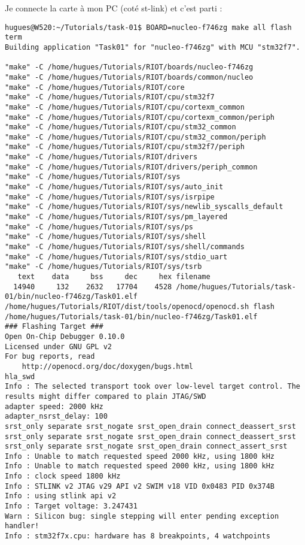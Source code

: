 Je connecte la carte à mon PC (coté st-link) et c'est parti :
{\scriptsize
\begin{verbatim}
hugues@W520:~/Tutorials/task-01$ BOARD=nucleo-f746zg make all flash term
Building application "Task01" for "nucleo-f746zg" with MCU "stm32f7".

"make" -C /home/hugues/Tutorials/RIOT/boards/nucleo-f746zg
"make" -C /home/hugues/Tutorials/RIOT/boards/common/nucleo
"make" -C /home/hugues/Tutorials/RIOT/core
"make" -C /home/hugues/Tutorials/RIOT/cpu/stm32f7
"make" -C /home/hugues/Tutorials/RIOT/cpu/cortexm_common
"make" -C /home/hugues/Tutorials/RIOT/cpu/cortexm_common/periph
"make" -C /home/hugues/Tutorials/RIOT/cpu/stm32_common
"make" -C /home/hugues/Tutorials/RIOT/cpu/stm32_common/periph
"make" -C /home/hugues/Tutorials/RIOT/cpu/stm32f7/periph
"make" -C /home/hugues/Tutorials/RIOT/drivers
"make" -C /home/hugues/Tutorials/RIOT/drivers/periph_common
"make" -C /home/hugues/Tutorials/RIOT/sys
"make" -C /home/hugues/Tutorials/RIOT/sys/auto_init
"make" -C /home/hugues/Tutorials/RIOT/sys/isrpipe
"make" -C /home/hugues/Tutorials/RIOT/sys/newlib_syscalls_default
"make" -C /home/hugues/Tutorials/RIOT/sys/pm_layered
"make" -C /home/hugues/Tutorials/RIOT/sys/ps
"make" -C /home/hugues/Tutorials/RIOT/sys/shell
"make" -C /home/hugues/Tutorials/RIOT/sys/shell/commands
"make" -C /home/hugues/Tutorials/RIOT/sys/stdio_uart
"make" -C /home/hugues/Tutorials/RIOT/sys/tsrb
   text	   data	    bss	    dec	    hex	filename
  14940	    132	   2632	  17704	   4528	/home/hugues/Tutorials/task-01/bin/nucleo-f746zg/Task01.elf
/home/hugues/Tutorials/RIOT/dist/tools/openocd/openocd.sh flash /home/hugues/Tutorials/task-01/bin/nucleo-f746zg/Task01.elf
### Flashing Target ###
Open On-Chip Debugger 0.10.0
Licensed under GNU GPL v2
For bug reports, read
	http://openocd.org/doc/doxygen/bugs.html
hla_swd
Info : The selected transport took over low-level target control. The results might differ compared to plain JTAG/SWD
adapter speed: 2000 kHz
adapter_nsrst_delay: 100
srst_only separate srst_nogate srst_open_drain connect_deassert_srst
srst_only separate srst_nogate srst_open_drain connect_deassert_srst
srst_only separate srst_nogate srst_open_drain connect_assert_srst
Info : Unable to match requested speed 2000 kHz, using 1800 kHz
Info : Unable to match requested speed 2000 kHz, using 1800 kHz
Info : clock speed 1800 kHz
Info : STLINK v2 JTAG v29 API v2 SWIM v18 VID 0x0483 PID 0x374B
Info : using stlink api v2
Info : Target voltage: 3.247431
Warn : Silicon bug: single stepping will enter pending exception handler!
Info : stm32f7x.cpu: hardware has 8 breakpoints, 4 watchpoints

\end{verbatim}}
